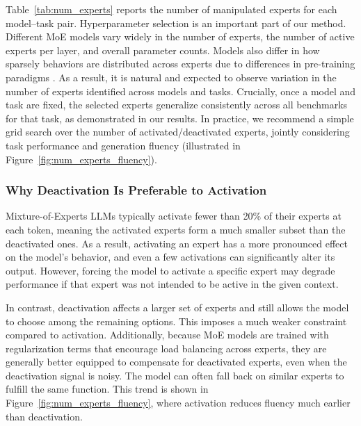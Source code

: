 \documentclass{article} %
\begin{document}


Table~\ref{tab:num_experts} reports the number of manipulated experts for each model–task pair. Hyperparameter selection is an important part of our method. Different MoE models vary widely in the number of experts, the number of active experts per layer, and overall parameter counts. Models also differ in how sparsely behaviors are distributed across experts due to differences in pre-training paradigms \citep{muennighoff2025olmoeopenmixtureofexpertslanguage}. As a result, it is natural and expected to observe variation in the number of experts identified across models and tasks.
Crucially, once a model and task are fixed, the selected experts generalize consistently across all benchmarks for that task, as demonstrated in our results. In practice, we recommend a simple grid search over the number of activated/deactivated experts, jointly considering task performance and generation fluency (illustrated in Figure~\ref{fig:num_experts_fluency}).


\subsubsection{Why Deactivation Is Preferable to Activation}

Mixture-of-Experts LLMs typically activate fewer than 20\% of their experts at each token, meaning the activated experts form a much smaller subset than the deactivated ones. As a result, activating an expert has a more pronounced effect on the model's behavior, and even a few activations can significantly alter its output. However, forcing the model to activate a specific expert may degrade performance if that expert was not intended to be active in the given context.

In contrast, deactivation affects a larger set of experts and still allows the model to choose among the remaining options. This imposes a much weaker constraint compared to activation. Additionally, because MoE models are trained with regularization terms that encourage load balancing across experts, they are generally better equipped to compensate for deactivated experts, even when the deactivation signal is noisy. The model can often fall back on similar experts to fulfill the same function. This trend is shown in Figure~\ref{fig:num_experts_fluency}, where activation reduces fluency much earlier than deactivation.
\end{document}
